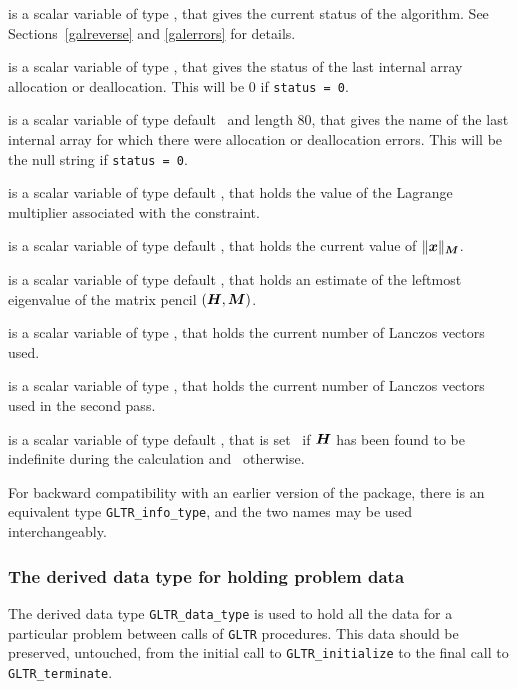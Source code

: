 \documentclass{galahad}
\newcommand{\packagename}{GL\-TR}
\begin{document}
\begin{description}
 is a scalar variable of type \integer, that gives the
current status of the algorithm. See Sections~\ref{galreverse} and
\ref{galerrors} for details.

 is a scalar variable of type \integer,
that gives the status of the last internal array allocation
or deallocation. This will be 0 if {\tt status = 0}.

 is a scalar variable of type default \character\
and length 80, that  gives the name of the last internal array
for which there were allocation or deallocation errors.
This will be the null string if {\tt status = 0}.

 is a scalar variable of type default
\realdp, that holds the
value of the Lagrange multiplier associated with the constraint.

 is a scalar variable of type default
\realdp,
that holds the current
value of $\|{\bm{x}}\|_{{\bm{M}}} $.

 is a scalar variable of type default
\realdp, that holds an estimate of the leftmost eigenvalue of the
matrix pencil $({\bm{H}},{\bm{M}})$.

 is a scalar variable of type \integer, that holds the
current number of Lanczos vectors used.

 is a scalar variable of type \integer, that holds the
current number of Lanczos vectors used in the second pass.

 is a scalar variable of type default \logical, that
is set \true\ if ${\bm{H}}$ has been found to be indefinite during the calculation
and \false\ otherwise.
\end{description}

\noindent
For backward compatibility with an earlier version of the package, there
is an equivalent type {\tt \packagename\_info\_type}, and the two names
may be used interchangeably.


\subsubsection{The derived data type for holding problem data}\label{typedata}
The derived data type
{\tt \packagename\_data\_type}
is used to hold all the data for a particular problem between calls of
{\tt \packagename} procedures.
This data should be preserved, untouched, from the initial call to
{\tt \packagename\_initialize}
to the final call to
{\tt \packagename\_terminate}.
\end{document}
